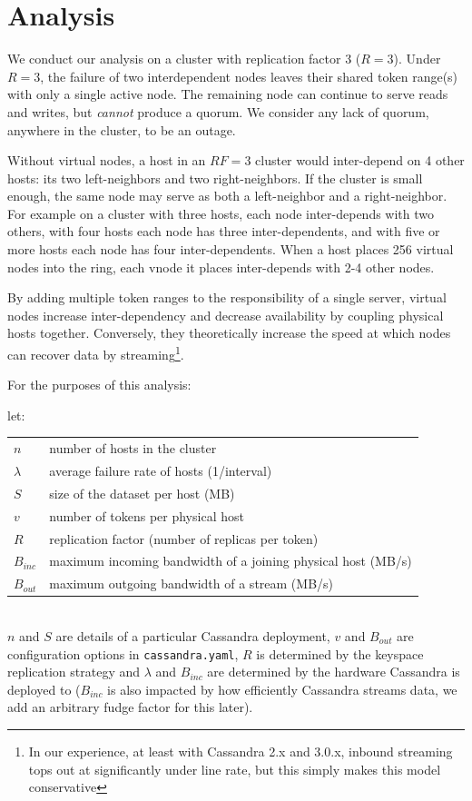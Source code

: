 \documentclass{article}
\makeatletter
\newenvironment{conditions}[1][let:]
  {#1 \begin{tabular}[t]{>{$}l<{$} @{${}={}$} l}}
  {\end{tabular}\\[\belowdisplayskip]}
\makeatother
\begin{document}
\section{Analysis}
\label{sec:analysis}
We conduct our analysis on a cluster with replication factor 3 ($R=3$). Under
$R=3$, the failure of two interdependent nodes leaves their shared token range(s) with only a  single active node. The remaining node can continue to serve reads
and writes, but \emph{cannot} produce a quorum. We consider any lack of quorum,
anywhere in the cluster, to be an outage.

Without virtual nodes, a host in an $RF=3$ cluster would inter-depend on 4
other hosts: its two left-neighbors and two right-neighbors. If the cluster
is small enough, the same node may serve as both a left-neighbor and a
right-neighbor. For example on a cluster with three hosts, each node
inter-depends with two others, with four hosts each node has three
inter-dependents, and with five or more hosts each node has four
inter-dependents. When a host places 256 virtual nodes into the ring, each
vnode it places inter-depends with 2-4 other nodes.

By adding multiple token ranges to the responsibility of a single server,
virtual nodes increase inter-dependency and decrease availability by
coupling physical hosts together. Conversely, they theoretically increase the
speed at which nodes can recover data by streaming\footnote{In our experience,
at least with Cassandra 2.x and 3.0.x, inbound streaming tops out at significantly
under line rate, but this simply makes this model conservative}.

For the purposes of this analysis:

\begin{conditions}
 n       &  number of hosts in the cluster \\
 \lambda &  average failure rate of hosts (1/interval) \\
 S       &  size of the dataset per host (MB) \\
 v       &  number of tokens per physical host \\
 R       &  replication factor (number of replicas per token) \\
 B_{inc} &  maximum incoming bandwidth of a joining physical host (MB/s) \\
 B_{out} &  maximum outgoing bandwidth of a stream (MB/s) \\
\end{conditions}
$n$ and $S$ are details of a particular Cassandra deployment, $v$ and $B_{out}$
are configuration options in \texttt{cassandra.yaml}, $R$ is determined by the
keyspace replication strategy and $\lambda$ and $B_{inc}$ are determined by the
hardware Cassandra is deployed to ($B_{inc}$ is also impacted by how efficiently
Cassandra streams data, we add an arbitrary fudge factor for this later).
\end{document}
